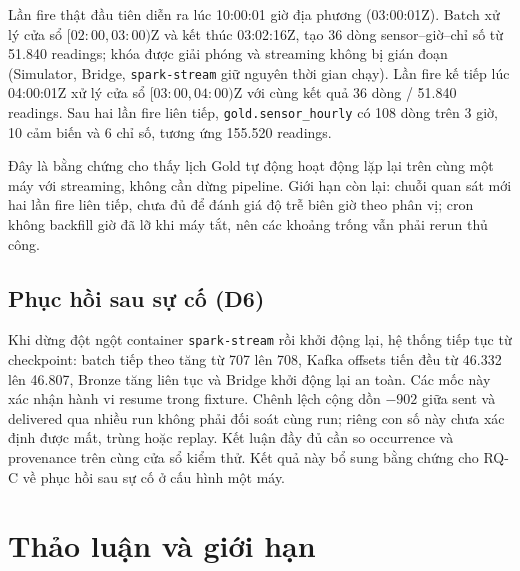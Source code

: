 Lần fire thật đầu tiên diễn ra lúc 10:00:01 giờ địa phương (03:00:01Z). Batch
xử lý cửa sổ $[02{:}00, 03{:}00)$Z và kết thúc 03:02:16Z, tạo 36 dòng
sensor--giờ--chỉ số từ 51.840 readings; khóa được giải phóng và streaming
không bị gián đoạn (Simulator, Bridge, \texttt{spark-stream} giữ nguyên thời
gian chạy). Lần fire kế tiếp lúc 04:00:01Z xử lý cửa sổ
$[03{:}00, 04{:}00)$Z với cùng kết quả 36 dòng / 51.840 readings. Sau hai lần
fire liên tiếp, \texttt{gold.sensor\_hourly} có 108 dòng trên 3 giờ, 10 cảm
biến và 6 chỉ số, tương ứng 155.520 readings.

Đây là bằng chứng cho thấy lịch Gold tự động hoạt động lặp lại trên cùng một
máy với streaming, không cần dừng pipeline. Giới hạn còn lại: chuỗi quan sát
mới hai lần fire liên tiếp, chưa đủ để đánh giá độ trễ biên giờ theo phân vị;
cron không backfill giờ đã lỡ khi máy tắt, nên các khoảng trống vẫn phải rerun
thủ công.

\subsection{Phục hồi sau sự cố (D6)}
\label{subsec:d6-detail}
Khi dừng đột ngột container \texttt{spark-stream} rồi khởi động lại, hệ thống tiếp tục từ checkpoint: batch tiếp theo tăng từ 707 lên 708, Kafka offsets tiến đều từ 46.332 lên 46.807, Bronze tăng liên tục và Bridge khởi động lại an toàn. Các mốc này xác nhận hành vi resume trong fixture. Chênh lệch cộng dồn
$-902$ giữa sent và delivered qua nhiều run không phải đối soát cùng run;
riêng con số này chưa xác định được mất, trùng hoặc replay. Kết luận đầy
đủ cần so occurrence và provenance trên cùng cửa sổ kiểm thử. Kết quả này bổ sung bằng chứng cho RQ-C về phục hồi sau sự cố ở cấu hình một máy.

\section{Thảo luận và giới hạn}

